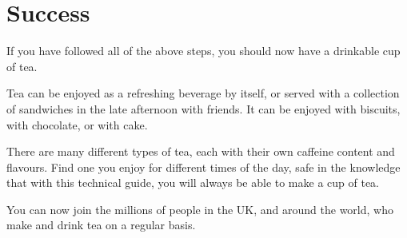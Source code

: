 \documentclass{article}
\begin{document}
\section{Success}
If you have followed all of the above steps, you should now have a drinkable cup of tea. 

Tea can be enjoyed as a refreshing beverage by itself, or served with a collection of sandwiches in the late afternoon with friends. It can be enjoyed with biscuits, with chocolate, or with cake. 

There are many different types of tea, each with their own caffeine content and flavours. Find one you enjoy for different times of the day, safe in the knowledge that with this technical guide, you will always be able to make a cup of tea.

You can now join the millions of people in the UK, and around the world, who make and drink tea on a regular basis.
\end{document}
